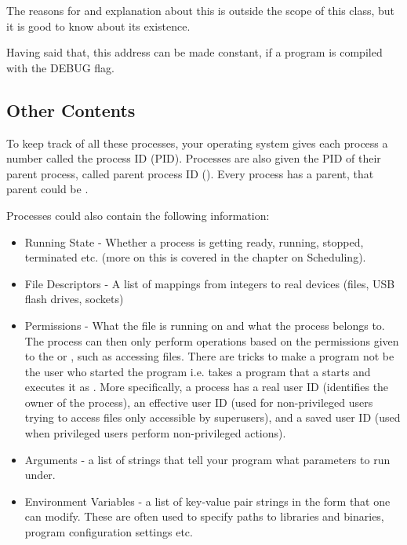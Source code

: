 \begin{itemize}
\begin{itemize}
          The reasons for and explanation about this is outside the scope of this class, but it is good to know about its existence.

          Having said that, this address can be made constant, if a program is compiled with the DEBUG flag.
\end{itemize}

\subsection{Other Contents}

To keep track of all these processes, your operating system gives each process a number called the process ID (PID).
Processes are also given the PID of their parent process, called parent process ID ().
Every process has a parent, that parent could be .

Processes could also contain the following information:

\begin{itemize}
    \item Running State - Whether a process is getting ready, running, stopped, terminated etc. (more on this is covered in the chapter on Scheduling).
    \item File Descriptors - A list of mappings from integers to real devices (files, USB flash drives, sockets)
    \item Permissions - What  the file is running on and what  the process belongs to.
          The process can then only perform operations based on the permissions given to the  or , such as accessing files.
          There are tricks to make a program not be the user who started the program i.e.  takes a program that a  starts and executes it as .
          More specifically, a process has a real user ID (identifies the owner of the process), an effective user ID (used for non-privileged users trying to access files only accessible by superusers), and a saved user ID (used when privileged users perform non-privileged actions).
    \item Arguments - a list of strings that tell your program what parameters to run under.
    \item Environment Variables - a list of key-value pair strings in the form  that one can modify. These are often used to specify paths to libraries and binaries, program configuration settings etc.
\end{itemize}


\end{itemize}
